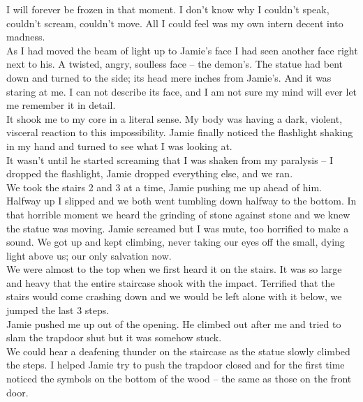 \documentclass[a5paper]{scrartcl}
\begin{document}
I will forever be frozen in that moment. I don't know why I couldn't speak, couldn't scream, couldn't move. All I could feel was my own intern decent into madness.\\


As I had moved the beam of light up to Jamie's face I had seen another face right next to his. A twisted, angry, soulless face – the demon's. The statue had bent down and turned to the side; its head mere inches from Jamie's. And it was staring at me. I can not describe its face, and I am not sure my mind will ever let me remember it in detail. \\


It shook me to my core in a literal sense. My body was having a dark, violent, visceral reaction to this impossibility. Jamie finally noticed the flashlight shaking in my hand and turned to see what I was looking at. \\


It wasn't until he started screaming that I was shaken from my paralysis – I dropped the flashlight, Jamie dropped everything else, and we ran.\\


We took the stairs 2 and 3 at a time, Jamie pushing me up ahead of him. Halfway up I slipped and we both went tumbling down halfway to the bottom. In that horrible moment we heard the grinding of stone against stone and we knew the statue was moving. Jamie screamed but I was mute, too horrified to make a sound. We got up and kept climbing, never taking our eyes off the small, dying light above us; our only salvation now.\\


We were almost to the top when we first heard it on the stairs. It was so large and heavy that the entire staircase shook with the impact. Terrified that the stairs would come crashing down and we would be left alone with it below, we jumped the last 3 steps.\\


Jamie pushed me up out of the opening. He climbed out after me and tried to slam the trapdoor shut but it was somehow stuck.\\


We could hear a deafening thunder on the staircase as the statue slowly climbed the steps. I helped Jamie try to push the trapdoor closed and for the first time noticed the symbols on the bottom of the wood – the same as those on the front door.\\
\end{document}
